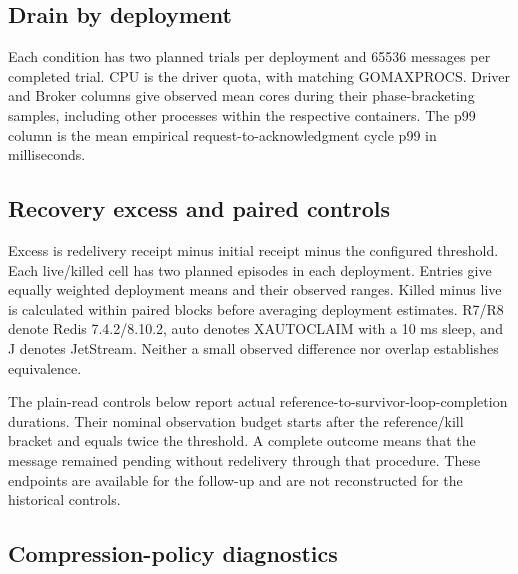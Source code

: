 \subsection{Drain by deployment}
Each condition has two planned trials per deployment and 65536 messages per completed trial. CPU is the driver quota, with matching GOMAXPROCS. Driver and Broker columns give observed mean cores during their phase-bracketing samples, including other processes within the respective containers. The p99 column is the mean empirical request-to-acknowledgment cycle p99 in milliseconds.
\begingroup\footnotesize\setlength{\tabcolsep}{3pt}

\endgroup

\subsection{Recovery excess and paired controls}
Excess is redelivery receipt minus initial receipt minus the configured threshold. Each live/killed cell has two planned episodes in each deployment. Entries give equally weighted deployment means and their observed ranges. Killed minus live is calculated within paired blocks before averaging deployment estimates. R7/R8 denote Redis 7.4.2/8.10.2, auto denotes XAUTOCLAIM with a 10 ms sleep, and J denotes JetStream. Neither a small observed difference nor overlap establishes equivalence.
\begingroup\footnotesize\setlength{\tabcolsep}{3pt}

\endgroup

The plain-read controls below report actual reference-to-survivor-loop-completion durations. Their nominal observation budget starts after the reference/kill bracket and equals twice the threshold. A complete outcome means that the message remained pending without redelivery through that procedure. These endpoints are available for the follow-up and are not reconstructed for the historical controls.
\begingroup\small

\endgroup

\subsection{Compression-policy diagnostics}
\begin{table}[!ht]
\centering\footnotesize\setlength{\tabcolsep}{3pt}

\caption{Current always-profile compression-policy sensitivity at sixteen publishers: equal-weight deployment means and ranges. Filler is the original compressible payload; Template is the fixed pseudorandom bank. Off/inherited is a matched throughput ratio; $n_i/n_o/n_p$ counts complete inherited/off trials/paired comparisons, each out of three. Both policies use the same Btrfs filesystem and NVMe device.}
\label{tab:followup-compression}
\end{table}

